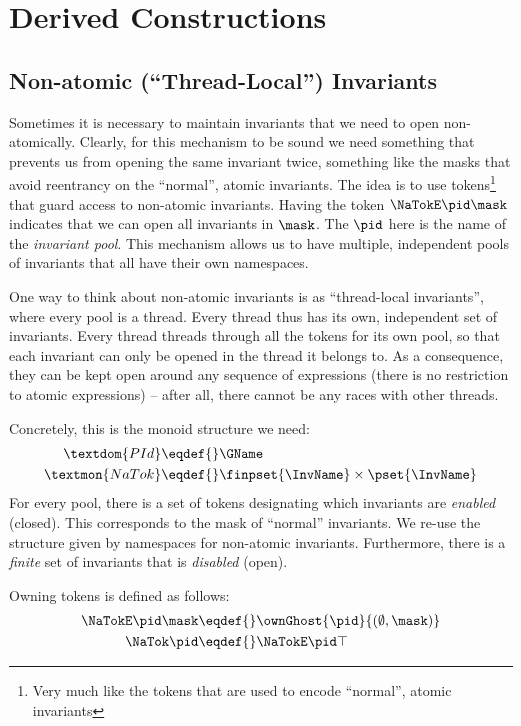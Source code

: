 \section{Derived Constructions}

\subsection{Non-atomic (``Thread-Local'') Invariants}

Sometimes it is necessary to maintain invariants that we need to open non-atomically.
Clearly, for this mechanism to be sound we need something that prevents us from opening the same invariant twice, something like the masks that avoid reentrancy on the ``normal'', atomic invariants.
The idea is to use tokens\footnote{Very much like the tokens that are used to encode ``normal'', atomic invariants} that guard access to non-atomic invariants.
Having the token $\NaTokE\pid\mask$ indicates that we can open all invariants in $\mask$.
The $\pid$ here is the name of the \emph{invariant pool}.
This mechanism allows us to have multiple, independent pools of invariants that all have their own namespaces.

One way to think about non-atomic invariants is as ``thread-local invariants'',
where every pool is a thread.
Every thread thus has its own, independent set of invariants.
Every thread threads through all the tokens for its own pool, so that each invariant can only be opened in the thread it belongs to.
As a consequence, they can be kept open around any sequence of expressions (\ie there is no restriction to atomic expressions) -- after all, there cannot be any races with other threads.

Concretely, this is the monoid structure we need:
\begin{align*}
\textdom{PId} \eqdef{}& \GName \\
\textmon{NaTok} \eqdef{}& \finpset{\InvName} \times \pset{\InvName}
\end{align*}
For every pool, there is a set of tokens designating which invariants are \emph{enabled} (closed).
This corresponds to the mask of ``normal'' invariants.
We re-use the structure given by namespaces for non-atomic invariants.
Furthermore, there is a \emph{finite} set of invariants that is \emph{disabled} (open).

Owning tokens is defined as follows:
\begin{align*}
\NaTokE\pid\mask \eqdef{}& \ownGhost{\pid}{ (\emptyset, \mask) } \\
\NaTok\pid \eqdef{}& \NaTokE\pid\top
\end{align*}

